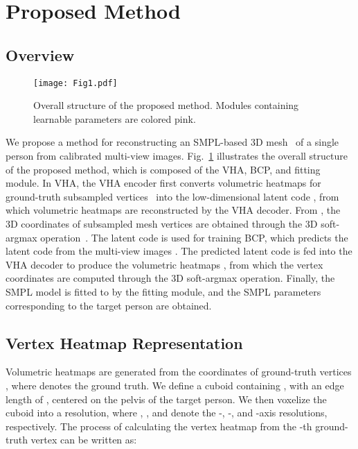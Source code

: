 \documentclass{article}
\begin{document}
\section{Proposed Method}
\label{sec:proposed_method}

\subsection{Overview}
\label{ssec:overview}

\begin{figure}[t]
\centering
\texttt{[image: Fig1.pdf]}
\caption{Overall structure of the proposed method. Modules containing learnable parameters are colored pink.}
\label{fig:overview}
\end{figure}

We propose a method for reconstructing an SMPL-based 3D mesh~\cite{2015_SMPL} of a single person from  calibrated multi-view images. Fig.~\ref{fig:overview} illustrates the overall structure of the proposed method, which is composed of the VHA, BCP, and fitting module. In VHA, the VHA encoder first converts volumetric heatmaps  for  ground-truth subsampled vertices~\cite{Chun_2023_WACV} into the low-dimensional latent code , from which volumetric heatmaps  are reconstructed by the VHA decoder. From , the 3D coordinates of subsampled mesh vertices  are obtained through the 3D soft-argmax operation~\cite{2018_Sun, 2019_LT, Chun_2023_WACV}. The latent code  is used for training BCP, which predicts the latent code  from the  multi-view images . The predicted latent code  is fed into the VHA decoder to produce the volumetric heatmaps , from which the vertex coordinates  are computed through the 3D soft-argmax operation. Finally, the SMPL model is fitted to  by the fitting module, and the SMPL parameters corresponding to the target person are obtained.


\subsection{Vertex Heatmap Representation}
\label{ssec:heatmap_representation}

Volumetric heatmaps  are generated from the coordinates of ground-truth vertices , where  denotes the ground truth. We define a cuboid containing , with an edge length of , centered on the pelvis of the target person. We then voxelize the cuboid into a  resolution, where , , and  denote the -, -, and -axis resolutions, respectively. The process of calculating the vertex heatmap  from the -th ground-truth vertex can be written as:
\end{document}
